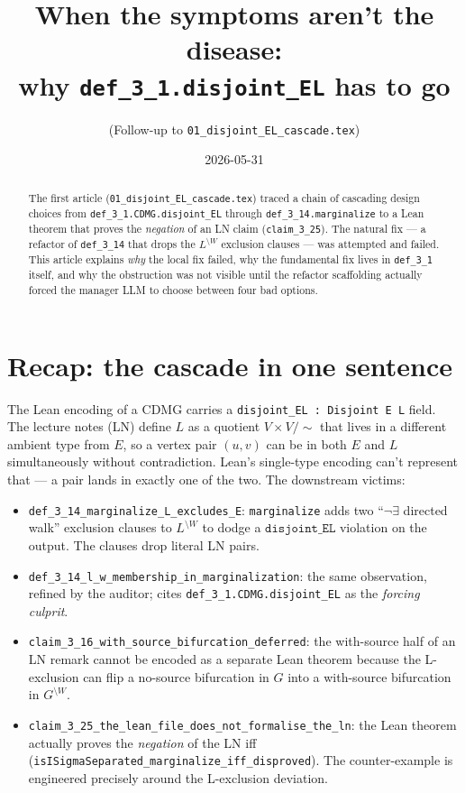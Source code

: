 \documentclass[11pt,a4paper]{article}
\title{When the symptoms aren't the disease: \\
why \texttt{def\_3\_1.disjoint\_EL} has to go}
\author{(Follow-up to \texttt{01\_disjoint\_EL\_cascade.tex})}
\date{2026-05-31}
\providecommand{\sm}{\setminus}
\begin{document}
\maketitle

\begin{abstract}
The first article (\texttt{01\_disjoint\_EL\_cascade.tex}) traced a
chain of cascading design choices from \texttt{def\_3\_1.CDMG.disjoint\_EL}
through \texttt{def\_3\_14.marginalize} to a Lean theorem that proves
the \emph{negation} of an LN claim (\texttt{claim\_3\_25}).
The natural fix --- a refactor of \texttt{def\_3\_14} that drops the
$L^{\sm W}$ exclusion clauses --- was attempted and failed.
This article explains \emph{why} the local fix failed, why the
fundamental fix lives in \texttt{def\_3\_1} itself, and why the
obstruction was not visible until the refactor scaffolding actually
forced the manager LLM to choose between four bad options.
\end{abstract}

\section{Recap: the cascade in one sentence}

The Lean encoding of a CDMG carries a \texttt{disjoint\_EL : Disjoint E L}
field. The lecture notes (LN) define $L$ as a quotient
$V \times V / \sim$ that lives in a different ambient type from $E$,
so a vertex pair $(u, v)$ can be in both $E$ and $L$ simultaneously
without contradiction. Lean's single-type encoding can't represent
that --- a pair lands in exactly one of the two. The downstream
victims:

\begin{itemize}
  \item \texttt{def\_3\_14\_marginalize\_L\_excludes\_E}: \texttt{marginalize}
        adds two ``$\neg\exists$ directed walk'' exclusion clauses to $L^{\sm W}$
        to dodge a $\texttt{disjoint\_EL}$ violation on the output.
        The clauses drop literal LN pairs.
  \item \texttt{def\_3\_14\_l\_w\_membership\_in\_marginalization}: the
        same observation, refined by the auditor; cites
        \verb|def_3_1.CDMG.disjoint_EL| as the \emph{forcing culprit}.
  \item \texttt{claim\_3\_16\_with\_source\_bifurcation\_deferred}: the
        with-source half of an LN remark cannot be encoded as a
        separate Lean theorem because the L-exclusion can flip a
        no-source bifurcation in $G$ into a with-source bifurcation
        in $G^{\sm W}$.
  \item \texttt{claim\_3\_25\_the\_lean\_file\_does\_not\_formalise\_the\_ln}:
        the Lean theorem actually proves the \emph{negation} of the LN
        iff (\verb|isISigmaSeparated_marginalize_iff_disproved|).
        The counter-example is engineered precisely around the
        L-exclusion deviation.
\end{itemize}
\end{document}
